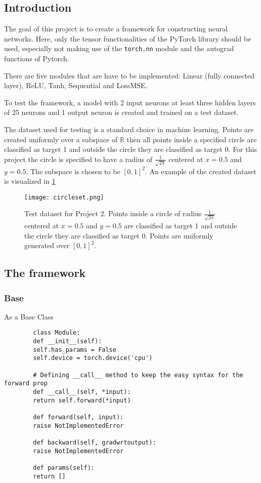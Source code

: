 \documentclass[11pt,english]{article}
\begin{document}
	\subsection{Introduction} \label{ssec:Intro2}
	The goal of this project is to create a framework for constructing neural networks. Here, only the tensor functionalities of the PyTorch library should be used, especially not making use of the \lstinline|torch.nn| module and the autograd functions of Pytorch.
	
	There are five modules that are have to be implemented: Linear (fully connected layer), ReLU, Tanh, Sequential and LossMSE.
	
	To test the framework, a model with 2 input neurons at least three hidden layers of 25 neurons and 1 output neuron is created and trained on a test dataset. 
	
	The dataset used for testing is a standard choice in machine learning. Points are created uniformly over a subspace of $\mathbb{R}$ then all points inside a specified circle are classified as target 1 and outside the circle they are classified as target 0. For this project the circle is specified to have a radius of $\frac{1}{\sqrt{2 \pi}}$ centered at $x=0.5$ and $y=0.5$. The subspace is chosen to be $[0, 1]^2$. An example of the created dataset is visualized in \cref{fig:circleset}
	
	\begin{figure}[H]
		\centering
		\texttt{[image: 
			circleset.png]}
		\caption{Test dataset for Project 2. Points inside a circle of radius $\frac{1}{\sqrt{2 \pi}}$ centered at $x=0.5$ and $y=0.5$ are classified as target 1 and outside the circle they are classified as target 0. Points are uniformly generated over $[0, 1]^2$.}
		\label{fig:circleset}
	\end{figure}  
	
	\subsection{The framework} \label{ssec:framework}
	
	\subsubsection{Base}
	
	As a Base Class 
	
	\begin{lstlisting}
		class Module:
		def __init__(self):
		self.has_params = False
		self.device = torch.device('cpu')
		
		# Defining __call__ method to keep the easy syntax for the forward prop
		def __call__(self, *input):
		return self.forward(*input)
		
		def forward(self, input):
		raise NotImplementedError
		
		def backward(self, gradwrtoutput):
		raise NotImplementedError
		
		def params(self):
		return []
	\end{lstlisting}
	
\end{document}
